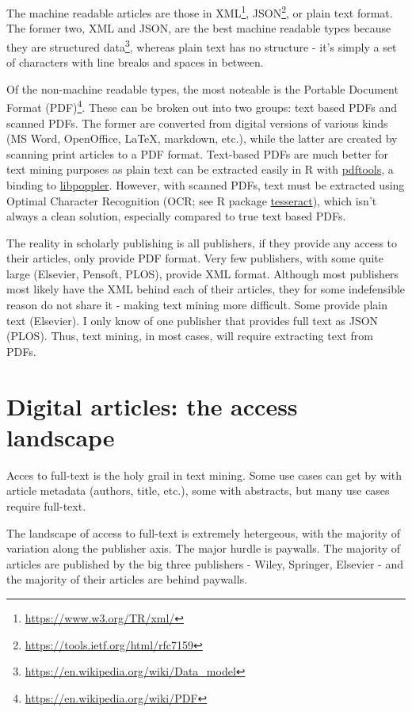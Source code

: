 \documentclass[author-year, review, 11pt]{components/elsarticle} %
\begin{document}
The machine readable articles are those in XML\footnote{\url{https://www.w3.org/TR/xml/}},
JSON\footnote{\url{https://tools.ietf.org/html/rfc7159}}, or plain text
format. The former two, XML and JSON, are the best machine readable
types because they are structured data\footnote{\url{https://en.wikipedia.org/wiki/Data_model}},
whereas plain text has no structure - it's simply a set of characters
with line breaks and spaces in between.

Of the non-machine readable types, the most noteable is the Portable
Document Format (PDF)\footnote{\url{https://en.wikipedia.org/wiki/PDF}}.
These can be broken out into two groups: text based PDFs and scanned
PDFs. The former are converted from digital versions of various kinds
(MS Word, OpenOffice, LaTeX, markdown, etc.), while the latter are
created by scanning print articles to a PDF format. Text-based PDFs are
much better for text mining purposes as plain text can be extracted
easily in R with \href{https://github.com/ropensci/pdftools}{pdftools},
a binding to \href{https://poppler.freedesktop.org/}{libpoppler}.
However, with scanned PDFs, text must be extracted using Optimal
Character Recognition (OCR; see R package
\href{https://github.com/ropensci/tesseract}{tesseract}), which isn't
always a clean solution, especially compared to true text based PDFs.

The reality in scholarly publishing is all publishers, if they provide
any access to their articles, only provide PDF format. Very few
publishers, with some quite large (Elsevier, Pensoft, PLOS), provide XML
format. Although most publishers most likely have the XML behind each of
their articles, they for some indefensible reason do not share it -
making text mining more difficult. Some provide plain text (Elsevier). I
only know of one publisher that provides full text as JSON (PLOS). Thus,
text mining, in most cases, will require extracting text from PDFs.

\hypertarget{digital-articles-the-access-landscape}{%
\section{Digital articles: the access
landscape}\label{digital-articles-the-access-landscape}}

Acces to full-text is the holy grail in text mining. Some use cases can
get by with article metadata (authors, title, etc.), some with
abstracts, but many use cases require full-text.

The landscape of access to full-text is extremely hetergeous, with the
majority of variation along the publisher axis. The major hurdle is
paywalls. The majority of articles are published by the big three
publishers - Wiley, Springer, Elsevier - and the majority of their
articles are behind paywalls.
\end{document}
